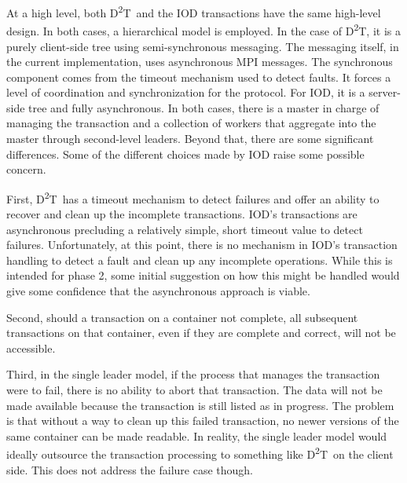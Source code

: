 \documentclass[conference]{sig-alt-gov2}
\newcommand{\DDT}{D\textsuperscript{2}T~}
\newcommand{\DDTns}{D\textsuperscript{2}T}
\begin{document}
At a high level, both \DDT and the IOD transactions have the same high-level
design. In both cases, a hierarchical model is employed. In the case of \DDTns,
it is a purely client-side tree using semi-synchronous messaging. The messaging
itself, in the current implementation, uses asynchronous MPI messages. The
synchronous component comes from the timeout mechanism used to detect faults.
It forces a level of coordination and synchronization for the protocol. For
IOD, it is a server-side tree and fully asynchronous. In both cases, there is a
master in charge of managing the transaction and a collection of workers that
aggregate into the master through second-level leaders. Beyond that, there are
some significant differences. Some of the different choices made by IOD raise
some possible concern.

First, \DDT has a timeout mechanism to detect failures and offer an ability to
recover and clean up the incomplete transactions. IOD's transactions are
asynchronous precluding a relatively simple, short timeout value to detect
failures. Unfortunately, at this point, there is no mechanism in IOD's
transaction handling to detect a fault and clean up any incomplete operations.
While this is intended for phase 2, some initial suggestion on how this might
be handled would give some confidence that the asynchronous approach is viable.

Second, should a transaction on a container not complete, all subsequent
transactions on that container, even if they are complete and correct, will not
be accessible.

Third, in the single leader model, if the process that manages the transaction
were to fail, there is no ability to abort that transaction. The data will not
be made available because the transaction is still listed as in progress. The
problem is that without a way to clean up this failed transaction, no newer
versions of the same container can be made readable. In reality, the single
leader model would ideally outsource the transaction processing to something
like \DDT on the client side. This does not address the failure case though.
\end{document}
